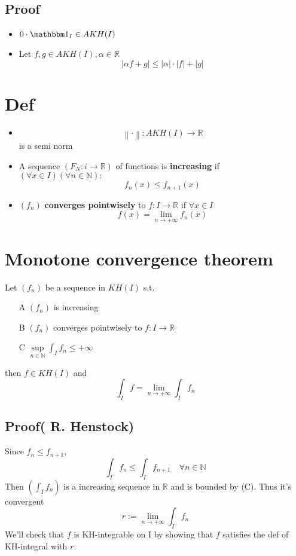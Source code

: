 \documentclass{book}
\newcommand{\abs}[1]{\left\lvert #1 \right\rvert}
\newcommand{\norm}[1]{\left\lVert #1 \right\rVert}
\begin{document}
\subsection*{Proof}
\begin{itemize}
    \item $0\cdot\mathbbm 1_I\in AKH(I)$
    \item Let $f,g \in AKH(I), \alpha\in \mathbb R$$$\abs{\alpha f+g}\leq\abs\alpha\cdot\abs f+\abs g$$
\end{itemize}
\section{Def}
\begin{itemize}
    \item $$\norm\cdot:AKH(I)\rightarrow\mathbb R$$is a semi norm
    \item A sequence $(F_N:i\to\mathbb R)$ of functions is \textbf{increasing} if $(\forall x\in I)(\forall n\in \mathbb N):$$$f_n(x)\leq f_{n+1}(x)$$
    \item $(f_n)$ \textbf{converges pointwisely} to $f:I\to\mathbb R$ if $\forall x\in I$$$f(x)=\lim\limits_{n\to+\infty}f_n(x)$$
\end{itemize}
\section{Monotone convergence theorem}
\label{Monotone convergence theorem}
Let $(f_n)$ be a sequence in $KH(I)$ s.t.\begin{itemize}
    \item[A] $(f_n)$ is increasing
    \item[B] $(f_n)$ converges pointwisely to $f:I\to\mathbb R$
    \item[C] $\sup\limits_{n\in \mathbb N}\int_If_n\leq+\infty$
\end{itemize}
then $f\in KH(I)$ and$$\int_If=\lim\limits_{n\to+\infty}\int_If_n$$
\subsection*{Proof( R. Henstock)}
Since $f_n\leq f_{n+1}$, $$\int_If_n\leq\int_If_{n+1}\quad \forall n\in \mathbb N$$
Then $(\int_If_n)$ is a increasing sequence in $\mathbb R$ and is bounded by (C). Thus it's convergent$$r:=\lim\limits_{n\to+\infty}\int_If_n$$
We'll check that $f$ is KH-integrable on I by showing that $f$ satisfies the def of KH-integral with $r$.
\end{document}
